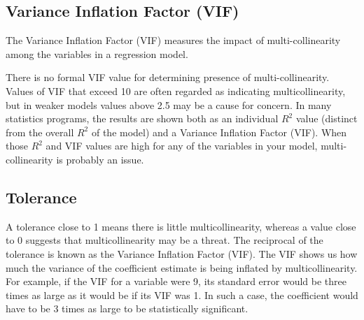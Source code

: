 \documentclass[a4paper,12pt]{article}
\begin{document}
\subsection{Variance Inflation Factor (VIF)}



The Variance Inflation Factor (VIF) measures the impact of multi-collinearity among the variables in a regression model. 

There is no formal VIF value for determining presence of multi-collinearity. Values of VIF that exceed 10 are often regarded as indicating multicollinearity, but in weaker models values above 2.5 may be a cause for concern. In many statistics programs, the results are shown both as an individual $R^2$ value (distinct from the overall $R^2$ of the model) and a Variance Inflation Factor (VIF). When those $R^2$ and VIF values are high for any of the variables in your model, multi-collinearity is probably an issue. 







\subsection{Tolerance}
A tolerance close to 1 means there is little multicollinearity, whereas a value close to 0 suggests that multicollinearity may be a threat. The reciprocal of the tolerance is known as the Variance Inflation Factor (VIF). The VIF shows us how much the variance of the coefficient estimate is being inflated by multicollinearity. For example, if the VIF for a variable were 9, its standard error would be three times as large as it would be if its VIF was 1. In such a case, the coefficient would have to be 3 times as large to be statistically significant.
\end{document}
